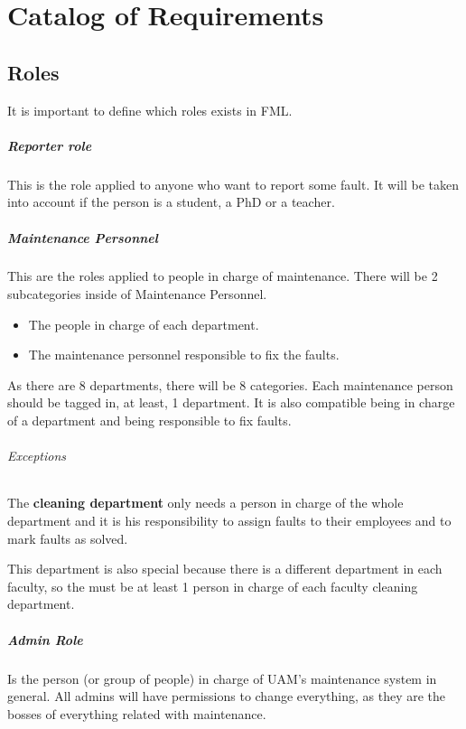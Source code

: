 \chapter{Catalog of Requirements}
\label{chapRequirements}
\section{Roles}
It is important to define which roles exists in FML.

\paragraph{Reporter role} \label{ReporterRole} This is the role applied to anyone who want to report some fault. It will be taken into account if the person is a student, a PhD or a teacher. 

\paragraph{Maintenance Personnel} \label{MaintenancePersonnel}

This are the roles applied to people in charge of maintenance. There will be 2 subcategories inside of Maintenance Personnel. 

\begin{itemize}
\item The people in charge of each department.
\item The maintenance personnel responsible to fix the faults.
\end{itemize}

As there are 8 departments, there will be 8 categories. Each maintenance person should be tagged in, at least, 1 department. It is also compatible being in charge of a department and being responsible to fix faults.

\subparagraph{Exceptions} The \textbf{cleaning department} only needs a person in charge of the whole department and it is his responsibility to assign faults to their employees and to mark faults as solved. 

This department is also special because there is a different department in each faculty, so the must be at least 1 person in charge of each faculty cleaning department.

\paragraph{Admin Role} Is the person (or group of people) in charge of UAM's maintenance system in general. All admins will have permissions to change everything, as they are the bosses of everything related with maintenance.

